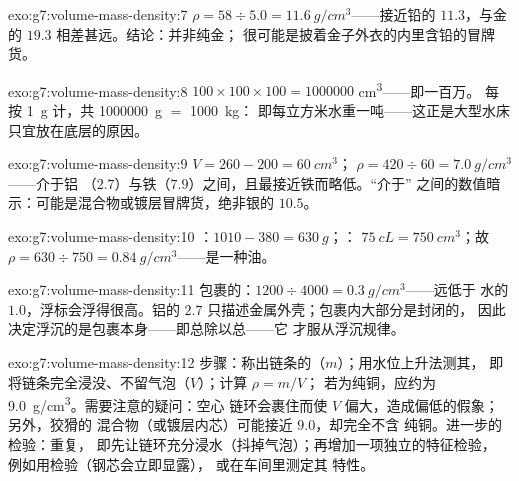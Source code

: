\begin{solution}{exo:g7:volume-mass-density:7}
$\rho = 58 \div 5.0 = \qty{11.6}{g/cm^3}$——接近铅的
$11.3$，与金的 $19.3$ 相差甚远。结论：并非纯金；
很可能是披着金子外衣的内里含铅的冒牌货。
\end{solution}

\begin{solution}{exo:g7:volume-mass-density:8}
$100 \times 100 \times 100 = 1000000$ \unit{cm^3}——即一百万。
每按 \qty{1}{g} 计，共 \qty{1000000}{g} $=$ \qty{1000}{kg}：
即每立方米水重一吨——这正是大型水床
只宜放在底层的原因。
\end{solution}

\begin{solution}{exo:g7:volume-mass-density:9}
$V = 260 - 200 = \qty{60}{cm^3}$；
$\rho = 420 \div 60 = \qty{7.0}{g/cm^3}$——介于铝
（$2.7$）与铁（$7.9$）之间，且最接近铁而略低。“介于”
之间的数值暗示：可能是混合物或镀层冒牌货，绝非银的
$10.5$。
\end{solution}

\begin{solution}{exo:g7:volume-mass-density:10}
：$1010 - 380 = \qty{630}{g}$；：
$\qty{75}{cL} = \qty{750}{cm^3}$；故 $\rho = 630 \div 750 =
\qty{0.84}{g/cm^3}$——是一种油。
\end{solution}

\begin{solution}{exo:g7:volume-mass-density:11}
包裹的：$1200 \div 4000 = \qty{0.3}{g/cm^3}$——远低于
水的 $1.0$，浮标会浮得很高。铝的 $2.7$
只描述金属外壳；包裹内大部分是封闭的，
因此决定浮沉的是包裹本身——即总除以总——它
才服从浮沉规律。
\end{solution}

\begin{solution}{exo:g7:volume-mass-density:12}
步骤：称出链条的（$m$）；用水位上升法测其，
即将链条完全浸没、不留气泡（$V$）；计算 $\rho = m/V$；
若为纯铜，应约为 \qty{9.0}{g/cm^3}。需要注意的疑问：空心
链环会裹住而使 $V$ 偏大，造成偏低的假象；另外，狡猾的
混合物（或镀层内芯）可能接近 $9.0$，却完全不含
纯铜。进一步的检验：重复，
即先让链环充分浸水（抖掉气泡）；再增加一项独立的特征检验，
例如用检验（钢芯会立即显露），
或在车间里测定其
特性。
\end{solution}

